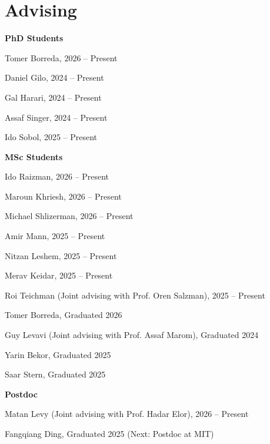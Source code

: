 \section{\sc Advising}

{\bf PhD Students}
\begin{list2}
  \item Tomer Borreda, 2026 -- Present
  \item Daniel Gilo, 2024 -- Present
  \item Gal Harari, 2024 -- Present
  \item Assaf Singer, 2024 -- Present
  \item Ido Sobol, 2025 -- Present
\end{list2}
\vspace*{.05in}

{\bf MSc Students}
\begin{list2}
  \item Ido Raizman, 2026 -- Present
  \item Maroun Khriesh, 2026 -- Present
  \item Michael Shlizerman, 2026 -- Present
  \item Amir Mann, 2025 -- Present
  \item Nitzan Leshem, 2025 -- Present
  \item Merav Keidar, 2025 -- Present
  \item Roi Teichman (Joint advising with Prof. Oren Salzman), 2025 -- Present
  \item Tomer Borreda, Graduated 2026
  \item Guy Levavi (Joint advising with Prof. Assaf Marom), Graduated 2024
  \item Yarin Bekor, Graduated 2025
  \item Saar Stern, Graduated 2025
\end{list2}
\vspace*{.05in}

{\bf Postdoc}
\begin{list2}
  \item Matan Levy (Joint advising with Prof. Hadar Elor), 2026 -- Present
  \item Fangqiang Ding, Graduated 2025 (Next: Postdoc at MIT)
\end{list2}
\vspace*{.05in}

